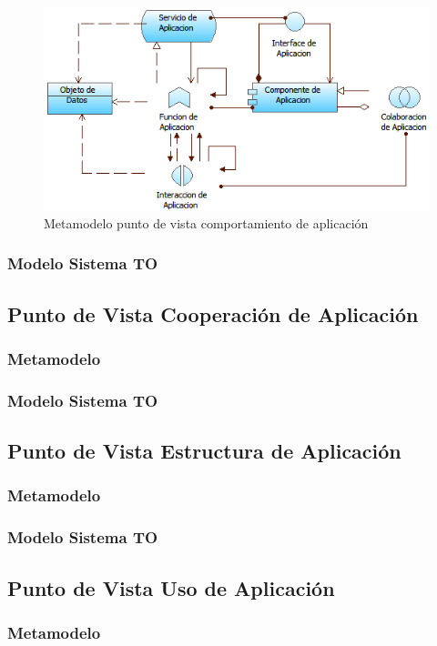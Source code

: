     \begin{figure}[h]
    	\centering
    	\includegraphics{Imagenes/Metamodelos/07}
    	\caption{Metamodelo punto de vista comportamiento de aplicación \cite{ref9}}
    	\label{metamodelo7}
    \end{figure}
    	\subsubsection{Modelo Sistema TO}
    \subsection{Punto de Vista Cooperación de Aplicación}
    	\subsubsection{Metamodelo}
    	\subsubsection{Modelo Sistema TO}
    \subsection{Punto de Vista Estructura de Aplicación}
		\subsubsection{Metamodelo}
		\subsubsection{Modelo Sistema TO}
    \subsection{Punto de Vista Uso de Aplicación}
	    \subsubsection{Metamodelo}

